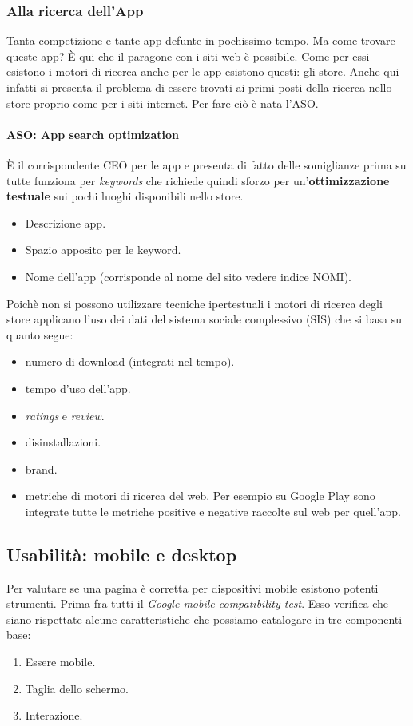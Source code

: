 		\subsubsection{Alla ricerca dell'App}
			Tanta competizione e tante app defunte in pochissimo tempo. Ma come trovare queste app? È qui che il paragone con i siti web è possibile. Come per essi esistono i motori di ricerca anche per le app esistono questi: gli store. Anche qui infatti si presenta il problema di essere trovati ai primi posti della ricerca nello store proprio come per i siti internet. Per fare ciò è nata l'ASO.
			
			\paragraph{ASO: App search optimization}
				È il corrispondente CEO per le app e presenta di fatto delle somiglianze prima su tutte funziona per \emph{keywords} che richiede quindi sforzo per un'\textbf{ottimizzazione testuale} sui pochi luoghi disponibili nello store.
				\begin{itemize}
					\item Descrizione app.
					\item Spazio apposito per le keyword.
					\item Nome dell'app (corrisponde al nome del sito vedere indice NOMI).
				\end{itemize}
				Poichè non si possono utilizzare tecniche ipertestuali i motori di ricerca degli store applicano l'uso dei dati del sistema sociale complessivo (SIS) che si basa su quanto segue:
				\begin{itemize}
					\item numero di download (integrati nel tempo).
					\item tempo d'uso dell'app.
					\item \emph{ratings} e \emph{review}.
					\item disinstallazioni.
					\item brand.
					\item metriche di motori di ricerca del web. Per esempio su Google Play sono integrate tutte le metriche positive e negative raccolte sul web per quell'app.
				\end{itemize}
							
			
	\subsection{Usabilità: mobile e desktop}
		Per valutare se una pagina è corretta per dispositivi mobile esistono potenti strumenti. Prima fra tutti il \emph{Google mobile compatibility test}. Esso verifica che siano rispettate alcune caratteristiche che possiamo catalogare in tre componenti base:
		\begin{enumerate}
			\item Essere mobile.
			\item Taglia dello schermo.
			\item Interazione.
		\end{enumerate}
		
